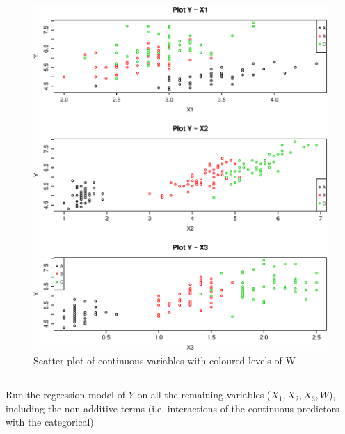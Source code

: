 \documentclass{article}
\begin{document}
  \begin{figure}[H]
  \centering
  \includegraphics[scale=0.6]{scattercolors.eps}
  \caption{Scatter plot of continuous variables with coloured levels of W}
  \label{fig:scattercolors}
  \end{figure}

\subsection{}
Run the regression model of $Y$ on all the remaining variables ($X_1, X_2, X_3,
W$), including the non-additive terms (i.e. interactions of the continuous
predictors with the categorical)
\end{document}
